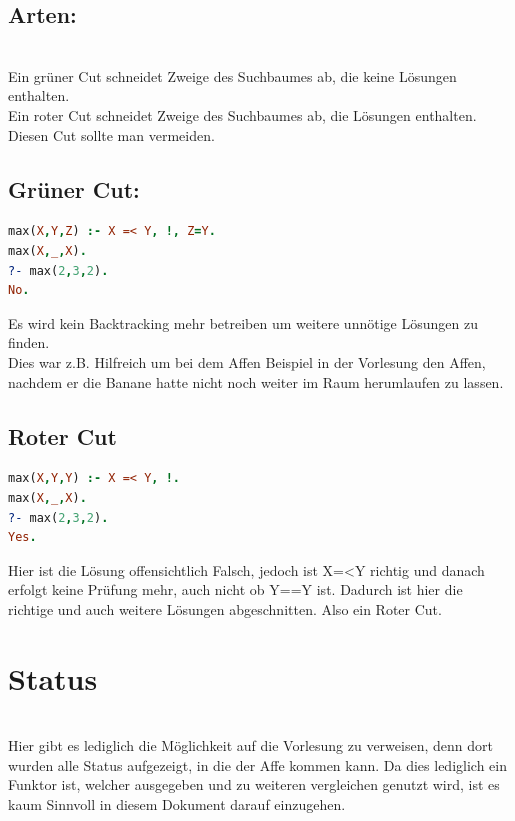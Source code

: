 \subsection{Arten:}\qquad\\
Ein grüner Cut schneidet Zweige des Suchbaumes ab, die keine Lösungen enthalten.\\
Ein roter Cut schneidet Zweige des Suchbaumes ab, die Lösungen enthalten. Diesen Cut sollte man vermeiden.
\subsection{Grüner Cut:}
\begin{lstlisting}[language=Prolog] 
max(X,Y,Z) :- X =< Y, !, Z=Y.
max(X,_,X).
?- max(2,3,2).
No.
\end{lstlisting}
Es wird kein Backtracking mehr betreiben um weitere unnötige Lösungen zu finden. \\
Dies war z.B. Hilfreich um bei dem Affen Beispiel in der Vorlesung den Affen, nachdem er die Banane hatte nicht noch weiter im Raum herumlaufen zu lassen. \\
\newpage
\subsection{Roter Cut}
\begin{lstlisting}[language=Prolog] 
max(X,Y,Y) :- X =< Y, !.
max(X,_,X).
?- max(2,3,2).
Yes.
\end{lstlisting}
Hier ist die Lösung offensichtlich Falsch, jedoch ist X=<Y richtig und danach erfolgt keine Prüfung mehr, auch nicht ob Y==Y ist. Dadurch ist hier die richtige und auch weitere Lösungen abgeschnitten. Also ein Roter Cut.\\

\section{Status}\qquad\\
Hier gibt es lediglich die Möglichkeit auf die Vorlesung zu verweisen, denn dort wurden alle Status aufgezeigt, in die der Affe kommen kann. Da dies lediglich ein Funktor ist, welcher ausgegeben und zu weiteren vergleichen genutzt wird, ist es kaum Sinnvoll in diesem Dokument darauf einzugehen. 
